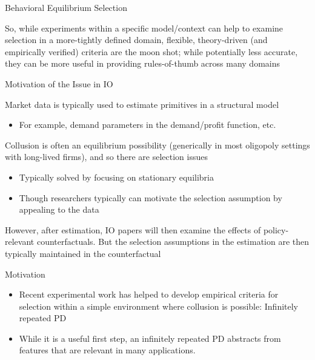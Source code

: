 \documentclass[english]{beamer}
\begin{document}
\begin{frame}{Behavioral Equilibrium Selection}
     \begin{card}
    So, while experiments within a specific model/context can help to examine selection in a more-tightly defined domain, flexible, theory-driven (and empirically verified) criteria are the moon shot; while potentially less accurate,  they can be more useful in providing rules-of-thumb across many domains
    \end{card}
\end{frame}

\begin{frame}{Motivation of the Issue in IO}
\begin{card}
    Market data is typically used to estimate primitives in a structural model 
        \begin{itemize}
            \item For example, demand parameters in the demand/profit function, etc.
        \end{itemize}
\end{card}
        \pause
\begin{card} Collusion is often an equilibrium possibility  (generically in most oligopoly settings with long-lived firms), and so there are selection issues
        \begin{itemize}
            \item Typically solved by focusing on stationary equilibria
            \item Though researchers typically can motivate the selection assumption by appealing to the data 
         \end{itemize}
\end{card}         
         \pause
    \begin{card}
    However, after estimation, IO papers will then examine the effects of policy-relevant counterfactuals. But the selection assumptions in the estimation are then typically maintained in the counterfactual
    \end{card}
\end{frame}

\begin{frame}{Motivation}
    \begin{card}
        \begin{itemize}
            \item Recent experimental work has helped to develop empirical criteria for selection within a simple environment where collusion is possible: Infinitely repeated PD
            \item While it is a useful first step, an infinitely repeated PD abstracts from features that are relevant in many applications.
        \end{itemize}
    \end{card}
\end{frame}
\end{document}
